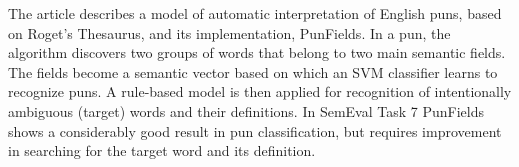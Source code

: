 The article describes a model of automatic interpretation of English puns, based on Roget{'}s Thesaurus, and its implementation, PunFields. In a pun, the algorithm discovers two groups of words that belong to two main semantic fields. The fields become a semantic vector based on which an SVM classifier learns to recognize puns. A rule-based model is then applied for recognition of intentionally ambiguous (target) words and their definitions. In SemEval Task 7 PunFields shows a considerably good result in pun classification, but requires improvement in searching for the target word and its definition.
